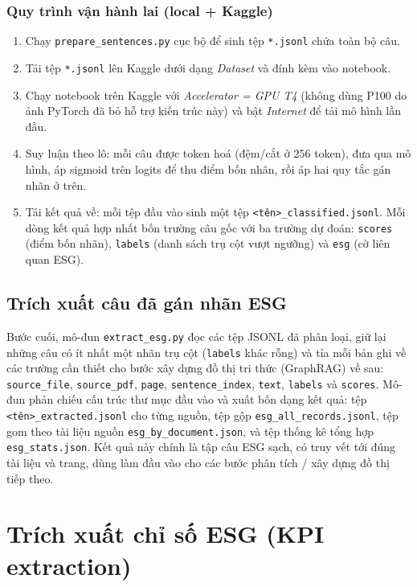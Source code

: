 \documentclass{article}
\begin{document}
\subsubsection{Quy trình vận hành lai (local + Kaggle)}

\begin{enumerate}
  \item Chạy \texttt{prepare\_sentences.py} cục bộ để sinh tệp \texttt{*.jsonl}
        chứa toàn bộ câu.
  \item Tải tệp \texttt{*.jsonl} lên Kaggle dưới dạng \textit{Dataset} và đính kèm
        vào notebook.
  \item Chạy notebook trên Kaggle với \textit{Accelerator = GPU T4} (không dùng
        P100 do ảnh PyTorch đã bỏ hỗ trợ kiến trúc này) và bật \textit{Internet}
        để tải mô hình lần đầu.
  \item Suy luận theo lô: mỗi câu được token hoá (đệm/cắt ở $256$ token), đưa qua
        mô hình, áp sigmoid trên logits để thu điểm bốn nhãn, rồi áp hai quy tắc
        gán nhãn ở trên.
  \item Tải kết quả về: mỗi tệp đầu vào sinh một tệp
        \texttt{<tên>\_classified.jsonl}. Mỗi dòng kết quả hợp nhất bốn trường câu
        gốc với ba trường dự đoán: \texttt{scores} (điểm bốn nhãn), \texttt{labels}
        (danh sách trụ cột vượt ngưỡng) và \texttt{esg} (cờ liên quan ESG).
\end{enumerate}

\subsection{Trích xuất câu đã gán nhãn ESG}

Bước cuối, mô-đun \texttt{extract\_esg.py} đọc các tệp JSONL đã phân loại, giữ lại
những câu có ít nhất một nhãn trụ cột (\texttt{labels} khác rỗng) và tỉa mỗi bản
ghi về các trường cần thiết cho bước xây dựng đồ thị tri thức (GraphRAG) về sau:
\texttt{source\_file}, \texttt{source\_pdf}, \texttt{page}, \texttt{sentence\_index},
\texttt{text}, \texttt{labels} và \texttt{scores}. Mô-đun phản chiếu cấu trúc thư
mục đầu vào và xuất bốn dạng kết quả: tệp \texttt{<tên>\_extracted.jsonl} cho từng
nguồn, tệp gộp \texttt{esg\_all\_records.jsonl}, tệp gom theo tài liệu nguồn
\texttt{esg\_by\_document.json}, và tệp thống kê tổng hợp \texttt{esg\_stats.json}.
Kết quả này chính là tập câu ESG sạch, có truy vết tới đúng tài liệu và trang,
dùng làm đầu vào cho các bước phân tích / xây dựng đồ thị tiếp theo.

\section{Trích xuất chỉ số ESG (KPI extraction)}
\end{document}
